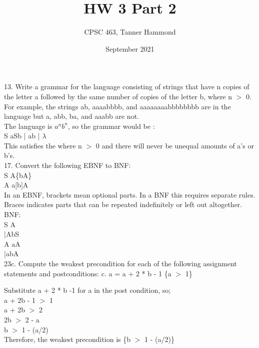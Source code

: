 \documentclass{article}
\title{HW 3 Part 2}
\author{CPSC 463,
        Tanner Hammond}
\date{September 2021}
\begin{document}
\maketitle

13. Write a grammar for the language consisting of strings that have n copies of the letter a followed by the same number of copies of the letter b, where n $>$ 0. For example, the strings ab, aaaabbbb, and aaaaaaaabbbbbbbb are in the language but a, abb, ba, and aaabb are not.\\
The language is $a^nb^n$, so the grammar would be : \\
S \rightarrow aSb | ab | $\lambda$\\
This satisfies the where n $>$ 0 and there will never be unequal amounts of a's or b's. \\

17. Convert the following EBNF to BNF: \\
S \rightarrow A\{bA\}\\
A \rightarrow a$[$b$]$A\\

In an EBNF, brackets mean optional parts. In a BNF this requires separate rules. \\
Braces indicates parts that can be repeated indefinitely or left out altogether. \\
BNF:\\
S \rightarrow A\\
\indent     |AbS\\
A \rightarrow aA\\
\indent |abA\\

23c. Compute the weakest precondition for each of the following assignment
statements and postconditions: c. a = a + 2 * b - 1 \{a $>$ 1\}

Substitute a + 2 * b -1 for a in the post condition, so;\\
a + 2b - 1 $>$ 1 \\
a + 2b $>$ 2 \\
2b $>$ 2 - a \\
b $>$ 1 - (a/2) \\

Therefore, the weakest precondition is \{b $>$ 1 - (a/2)\}
\end{document}
